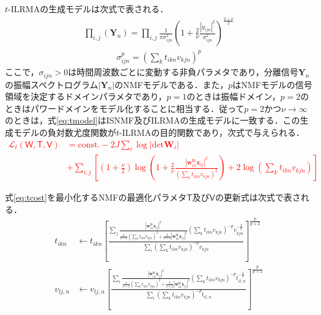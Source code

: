 $t$-ILRMAの生成モデルは次式で表される．
\begin{align}
     \prod_{i,j}\left(\bm{Y}_{n}\right)= \prod_{i,j}\frac{1}{\pi \sigma_{ijn}^{2} } \left( 1+\frac{2}{\nu}\frac{|y_{ijn}|^2}{\sigma_{ijn}^{2}} \right)^{\frac{2+\nu}{2}}　\label{eq:tmodel}
\end{align}
\begin{align}
     \sigma_{ijn}^{p}=\left(\sum_{k}t_{ikn}v_{kjn}\right)^{p} \label{eq:tsigma}
\end{align}
ここで，$\sigma_{ijn}>0$は時間周波数ごとに変動する非負パラメタであり，分離信号$\bm{Y}_{n}$の振幅スペクトログラム$|\bm{Y}_{n}|$のNMFモデルである．また，$p$はNMFモデルの信号領域を決定するドメインパラメタであり，$p=1$のときは振幅ドメイン，$p=2$のときはパワードメインをモデル化することに相当する．従って$p=2$かつ$\nu\rightarrow\infty$のときは，式\eqref{eq:tmodel}はISNMF及びILRMAの生成モデルに一致する．この生成モデルの負対数尤度関数が$t$-ILRMAの目的関数であり，次式で与えられる．
\textcolor{red}{
\begin{align}
    \nonumber \mathcal{L}_{t}(\mathsf{W, T, V}) &= \mathrm{const.}-2J \sum_{i}\log|\mathrm{det}\bm{W}_{i}| \\
&+ \sum_{i,j}\left\lbrack\left(1+\frac{\nu}{2}\right)\log\left(1+\frac{2}{\nu}\frac{|\bm{w}_{in}^{\mathrm{H}}\bm{x}_{ij}|^2}{\left(\sum_{k}t_{ikn}v_{kjn}\right)^2}\right)+2\log\left(\sum_{k}t_{ikn}v_{kjn}\right)\right\rbrack \label{eq:tcost}
\end{align}}

式\eqref{eq:tcost}を最小化するNMFの最適化パラメタ$\mathsf{T}$及び$\mathsf{V}$の更新式は次式で表される．
\begin{align}
    t_{ikn}&\leftarrow t_{ikn}\left\lbrack\frac{\sum_{j}\frac{|\bm{w}_{in}^{\mathrm{H}}\bm{x}_{ij}|^2}{\frac{\nu}{\nu+2}\left(\sum_{k}t_{ikn}v_{kjn}\right)^{2}+\frac{2}{\nu+2}|\bm{w}_{in}^{\mathrm{H}}\bm{x}_{ij}|^2}\left(\sum_{k}t_{ikn}v_{kjn}\right)^{-p}v_{kjn}^{-\frac{2}{p}}}{\sum_{i}\left(\sum_{k}t_{ikn}v_{kjn}\right)^{-p}v_{kjn}}\right\rbrack^{\frac{p}{p+2}} \label{eq:tt} \\
    v_{lj,n}&\leftarrow v_{lj,n}\left\lbrack\frac{\sum_{i}\frac{|\bm{w}_{in}^{\mathrm{H}}\bm{x}_{ij}|^2}{\frac{\nu}{\nu+2}\left(\sum_{k}t_{ikn}v_{kjn}\right)^{2}+\frac{2}{\nu+2}|\bm{w}_{in}^{\mathrm{H}}\bm{x}_{ij}|^2}\left(\sum_{k}t_{ikn}v_{kjn}\right)^{-p}t_{il,n}^{-\frac{2}{p}}}{\sum_{i}\left(\sum_{k}t_{ikn}v_{kjn}\right)^{-p}t_{il,n}}\right\rbrack^{\frac{p}{p+2}} \label{eq:tv}
\end{align}

